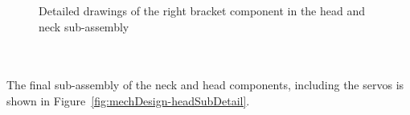         \begin{figure}[H]
        \centering
        \caption[Detailed drawings of the right bracket component in the head and neck sub-assembly]{Detailed drawings of the right bracket component in the head and neck sub-assembly}
        \label{fig:mechDesign-headRightBracket}
        \end{figure}

      \\\\
        The final sub-assembly of the neck and head components, including the servos is shown in Figure~\ref{fig:mechDesign-headSubDetail}.
        
